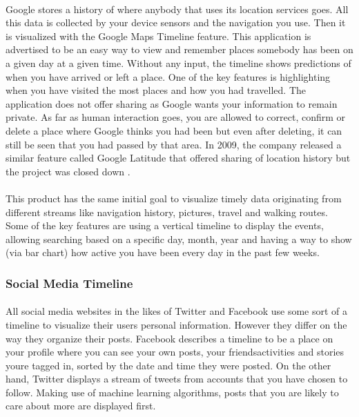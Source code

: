 \documentclass{l4proj}
\begin{document}
\paragraph{}
Google stores a history of where anybody that uses its location services goes. All this data is collected by your device sensors and the navigation you use. Then it is visualized with the Google Maps Timeline \cite{GoogleMapsTimeline} feature. This application is advertised to be an easy way to view and remember places somebody has been on a given day at a given time. Without any input, the timeline shows predictions of when you have arrived or left a place. One of the key features is highlighting when you have visited the most places and how you had travelled. The application does not offer sharing as Google wants your information to remain private. As far as human interaction goes, you are allowed to correct, confirm or delete a place where Google thinks you had been but even after deleting,  it can still be seen that you had passed by that area. In 2009, the company released a similar feature called Google Latitude that offered sharing of location history but the project was closed down \cite{GMTimeFeature}.

\paragraph{}
This product has the same initial goal to visualize timely data originating from different streams like navigation history, pictures, travel and walking routes. Some of the key features are using a vertical timeline to display the events, allowing searching based on a specific day, month, year and having a way to show (via bar chart) how active you have been every day in the past few weeks. 

\subsubsection{Social Media Timeline}
\paragraph{}
All social media websites in the likes of Twitter and Facebook use some sort of a timeline to visualize their user\textquotesingle s personal information. However they differ on the way they organize their posts. Facebook describes a timeline to be a place on your profile where you can see your own posts, your friends\textquotesingle  activities and stories you\textquotesingle re tagged in, sorted by the date and time they were posted. On the other hand, Twitter displays a stream of tweets from accounts that you have chosen to follow. Making use of machine learning algorithms, posts that you are likely to care about more are displayed first.
\end{document}
